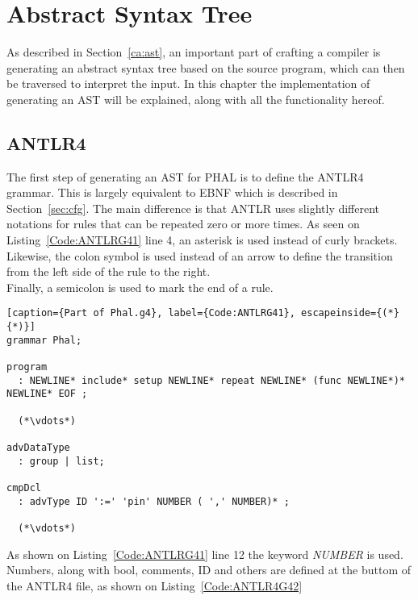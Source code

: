 \chapter{Abstract Syntax Tree}
As described in Section~\ref{ca:ast}, an important part of crafting a compiler is generating an abstract syntax tree based on the source program, which can then be traversed to interpret the input.
 In this chapter the implementation of generating an AST will be explained, along with all the functionality hereof. 

\section{ANTLR4}
The first step of generating an AST for PHAL is to define the ANTLR4 grammar. 
This is largely equivalent to EBNF which is described in Section~\ref{sec:cfg}.
The main difference is that ANTLR uses slightly different notations for rules that can be repeated zero or more times. 
As seen on Listing~\ref{Code:ANTLRG41} line 4, an asterisk is used instead of curly brackets. 
Likewise, the colon symbol is used instead of an arrow to define the transition from the left side of the rule to the right.
\\
Finally, a semicolon is used to mark the end of a rule.

\begin{lstlisting}[caption={Part of Phal.g4}, label={Code:ANTLRG41}, escapeinside={(*}{*)}]
grammar Phal;

program
  : NEWLINE* include* setup NEWLINE* repeat NEWLINE* (func NEWLINE*)* NEWLINE* EOF ;
   
  (*\vdots*)

advDataType    
  : group | list;

cmpDcl    	
  : advType ID ':=' 'pin' NUMBER ( ',' NUMBER)* ;

  (*\vdots*)
\end{lstlisting}
As shown on Listing~\ref{Code:ANTLRG41} line 12 the keyword \textit{NUMBER} is used. 
Numbers, along with bool, comments, ID and others are defined at the buttom of the ANTLR4 file, as shown on Listing~\ref{Code:ANTLR4G42}

